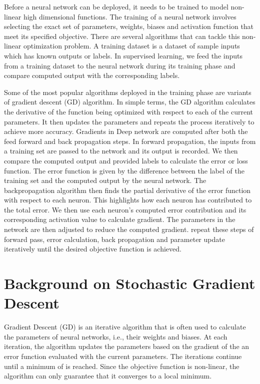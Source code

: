 \documentclass[conference]{IEEEtran}
\begin{document}

Before a neural network can be deployed, it needs to be trained to model non-linear high dimensional functions. The training of a neural network involves selecting the exact set of parameters, weights, biases and activation function that meet its specified objective. There are several algorithms that can tackle this non-linear optimization problem. A training dataset is a dataset of sample inputs which has  known outputs or labels. In supervised learning,  we feed the inputs from a training dataset to the neural network during its training phase and compare computed output with the corresponding labels.

Some of the most popular algorithms deployed in the training phase are variants of gradient descent (GD)  algorithm. In simple terms, the GD algorithm calculates the derivative of the function being optimized with respect to each of the current parameters. It then updates the parameters and repeats the process iteratively to achieve more accuracy. 
Gradients in Deep network are computed after both the feed forward and back propagation steps. In forward propagation, the inputs from a training set are passed to the network and its output is recorded. We then compare the computed output and provided labels to calculate the error or loss function. The error function is given by the difference between the label of the training set and the computed output by the neural network. The backpropagation algorithm then finds the partial derivative of the error function with respect to each neuron. This highlights how each neuron has contributed to the total error. We then use each neuron's computed error contribution and its corresponding activation value to calculate gradient. The parameters in the network are then adjusted to reduce the computed gradient.
 repeat these steps of forward pass, error calculation, back propagation and parameter update iteratively until the desired objective function is achieved.



\section{Background on Stochastic Gradient Descent}
Gradient Descent (GD) is an iterative algorithm that is often used to calculate the parameters of neural
networks, i.e., their weights and biases. At each iteration, the  algorithm updates the parameters based on the gradient of the 
an error function evaluated with the current parameters. The iterations continue until a minimum of  is reached. Since the objective
function is non-linear, the algorithm can only guarantee that it converges to a local minimum.
\end{document}

